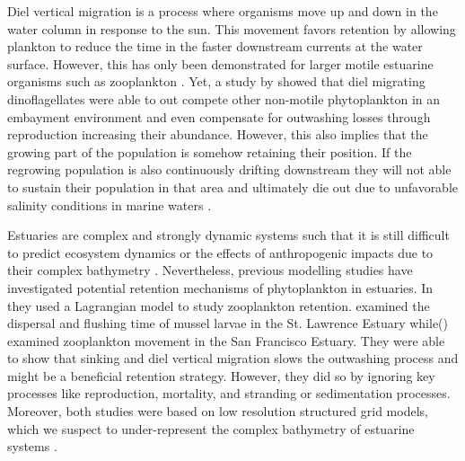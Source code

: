 \documentclass[npg, manuscript]{copernicus}
\begin{document}
Diel vertical migration is a process where organisms move up and down in the water column in response to the sun.
This movement favors retention by allowing plankton to reduce the time in the faster downstream currents at the water surface.
However, this has only been demonstrated for larger motile estuarine organisms such as zooplankton \citep{Hall2015, Kimmerer2002, Crawford1991,Hall2011}.
Yet, a study by \citet{Anderson1985} showed that diel migrating dinoflagellates were able to out compete other non-motile phytoplankton in an embayment environment and even compensate for outwashing losses through reproduction increasing their abundance.
However, this also implies that the growing part of the population is somehow retaining their position.
If the regrowing population is also continuously drifting downstream they will not able to sustain their population in that area and ultimately die out due to unfavorable salinity conditions in marine waters \citep{Admiraal1976, vonAlvensleben2016, Jiang2020}.

Estuaries are complex and strongly dynamic systems such that it is still difficult to predict ecosystem dynamics or the effects of anthropogenic impacts due to their complex bathymetry \citep{Michael2016, Fringer2019}. 
Nevertheless, previous modelling studies have investigated potential retention mechanisms of phytoplankton in estuaries.
In \citet{Simons2006,Kimmerer2014} they used a Lagrangian model to study zooplankton retention.
\citet{Simons2006} examined the dispersal and flushing time of mussel larvae in the St. Lawrence Estuary while() \citep{Kimmerer2014} examined zooplankton movement in the San Francisco Estuary.
They were able to show that sinking and diel vertical migration slows the outwashing process and might be a beneficial retention strategy.
However, they did so by ignoring key processes like reproduction, mortality, and stranding or sedimentation processes.
Moreover, both studies were based on low resolution structured grid models, which we suspect to under-represent the complex bathymetry of estuarine systems \citep{Ye2018}.
\end{document}
